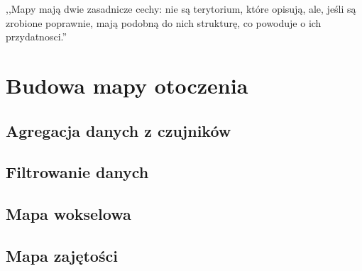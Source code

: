 

\begin{savequote}[70mm]
,,Mapy mają dwie zasadnicze cechy: nie są terytorium, które opisują, ale, jeśli są zrobione poprawnie, mają podobną do nich strukturę, co powoduje o ich przydatnosci.''
\end{savequote}


\chapter{Budowa mapy otoczenia}
\label{chap:mapa}

\section{Agregacja danych z czujników}
\section{Filtrowanie danych}
\section{Mapa wokselowa}
\section{Mapa zajętości}

